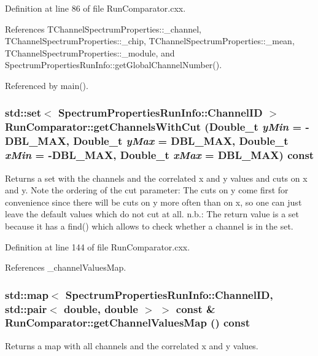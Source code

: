 Definition at line 86 of file RunComparator.cxx.

References TChannelSpectrumProperties::\_\-channel, TChannelSpectrumProperties::\_\-chip, TChannelSpectrumProperties::\_\-mean, TChannelSpectrumProperties::\_\-module, and SpectrumPropertiesRunInfo::getGlobalChannelNumber().

Referenced by main().\hypertarget{class_run_comparator_a3d58b62450dcc496322872f01774ce68}{
\subsubsection[{getChannelsWithCut}]{\setlength{\rightskip}{0pt plus 5cm}std::set$<$ {\bf SpectrumPropertiesRunInfo::ChannelID} $>$ RunComparator::getChannelsWithCut (Double\_\-t {\em yMin} = {\ttfamily -\/DBL\_\-MAX}, \/  Double\_\-t {\em yMax} = {\ttfamily DBL\_\-MAX}, \/  Double\_\-t {\em xMin} = {\ttfamily -\/DBL\_\-MAX}, \/  Double\_\-t {\em xMax} = {\ttfamily DBL\_\-MAX}) const}}
\label{class_run_comparator_a3d58b62450dcc496322872f01774ce68}


Returns a set with the channels and the correlated x and y values and cuts on x and y. Note the ordering of the cut parameter: The cuts on y come first for convenience since there will be cuts on y more often than on x, so one can just leave the default values which do not cut at all. n.b.: The return value is a set because it has a find() which allows to check whether a channel is in the set. 

Definition at line 144 of file RunComparator.cxx.

References \_\-channelValuesMap.\hypertarget{class_run_comparator_a47854c2f02d9632b0c9cd004820fee20}{
\subsubsection[{getChannelValuesMap}]{\setlength{\rightskip}{0pt plus 5cm}std::map$<$ {\bf SpectrumPropertiesRunInfo::ChannelID}, std::pair$<$ double, double $>$ $>$ const \& RunComparator::getChannelValuesMap () const}}
\label{class_run_comparator_a47854c2f02d9632b0c9cd004820fee20}


Returns a map with all channels and the correlated x and y values. 

